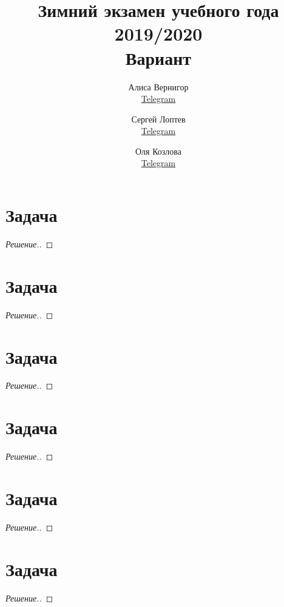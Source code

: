 \documentclass[a4paper]{article}
\title{Зимний экзамен учебного года 2019/2020\\Вариант \textnumero 1}
\author{	
    Алиса Вернигор       \\ \href{https://t.me/allisyonok}{Telegram} \and
	Сергей Лоптев        \\ \href{https://t.me/beast_sl}{Telegram} \and
	Оля Козлова        \\ \href{https://t.me/grenlayk}{Telegram}
}
\date{}
\theoremstyle{remark}
\begin{document}
	\maketitle

    \section*{Задача }
        \begin{proof}[Решение.]
		
        \end{proof}	 
    
    \section*{Задача }
	    \begin{proof}[Решение.]
		
        \end{proof}
    
    \section*{Задача }
	    \begin{proof}[Решение.]
		
        \end{proof}
    
    \section*{Задача }
	    \begin{proof}[Решение.]
		
        \end{proof}
    
    \section*{Задача }
	    \begin{proof}[Решение.]
		
        \end{proof}

    \section*{Задача }
	    \begin{proof}[Решение.]
		
        \end{proof}
\end{document}
